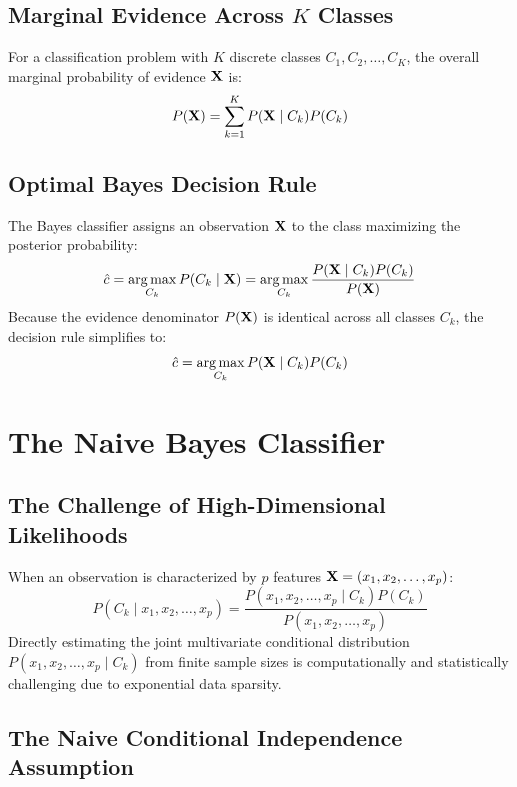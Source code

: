 \subsection{Marginal Evidence Across \texorpdfstring{$K$}{K} Classes}
For a classification problem with $K$ discrete classes $C_1, C_2, \dots, C_K$, the overall marginal probability of evidence $\mathbf{X}$ is:
\begin{equation}
P(\mathbf{X}) = \sum_{k=1}^K P(\mathbf{X} \mid C_k) P(C_k)
\end{equation}

\subsection{Optimal Bayes Decision Rule}
The Bayes classifier assigns an observation $\mathbf{X}$ to the class maximizing the posterior probability:
\begin{equation}
\hat{c} = \operatorname*{arg\,max}_{C_k} P(C_k \mid \mathbf{X}) = \operatorname*{arg\,max}_{C_k} \frac{P(\mathbf{X} \mid C_k) P(C_k)}{P(\mathbf{X})}
\end{equation}
Because the evidence denominator $P(\mathbf{X})$ is identical across all classes $C_k$, the decision rule simplifies to:
\begin{equation}
\hat{c} = \operatorname*{arg\,max}_{C_k} P(\mathbf{X} \mid C_k) P(C_k)
\end{equation}

\section{The Naive Bayes Classifier}

\subsection{The Challenge of High-Dimensional Likelihoods}
When an observation is characterized by $p$ features $\mathbf{X} = (x_1, x_2, \dots, x_p)$:
\begin{equation}
P(C_k \mid x_1, x_2, \dots, x_p) = \frac{P(x_1, x_2, \dots, x_p \mid C_k) P(C_k)}{P(x_1, x_2, \dots, x_p)}
\end{equation}
Directly estimating the joint multivariate conditional distribution $P(x_1, x_2, \dots, x_p \mid C_k)$ from finite sample sizes is computationally and statistically challenging due to exponential data sparsity.

\subsection{The Naive Conditional Independence Assumption}

